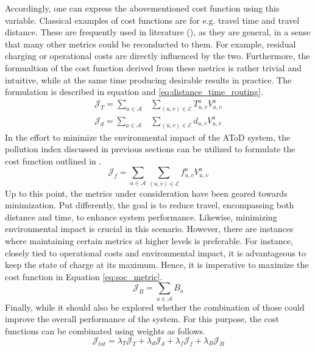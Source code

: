 Accordingly, one can express the abovementioned cost function using this variable. Classical examples of cost functions are for e.g. travel time and travel distance. These are frequently used in literature (\cite{7579135}), as they are general, in a sense that many other metrics could be reconducted to them. For example, residual charging or operational costs are directly influenced by the two. Furthermore, the formualtion of the cost function derived from these metrics is rather trivial and intuitive, while at the same time producing desirable results in practice. The formulation is described in equation  and \ref{eq:distance_time_routing}. \\
\begin{align}
	\mathcal{J}_T = \sum_{a \in \mathcal{A}} &\sum_{(u, v) \in \mathcal{E}} T^a_{ u,v} V^a_{u,v} \label{eq:travel_time_routing}\\
	\mathcal{J}_d = \sum_{a \in \mathcal{A}} &\sum_{(u, v) \in \mathcal{E}} d_{ u,v} V^a_{u,v}\label{eq:distance_time_routing}
\end{align} 
In the effort to minimize the environmental impact of the AToD system, the pollution index discussed in previous sections can be utilized to formulate the cost function outlined in .
\begin{equation}
	\mathcal{J}_f =\sum_{a \in \mathcal{A}} \sum_{(u, v) \in \mathcal{E}} f^a_{ u,v} V^a_{u,v} 
	\label{eq:pollution_metric}
\end{equation} 
Up to this point, the metrics under consideration have been geared towards minimization. Put differently, the goal is to reduce travel, encompassing both distance and time, to enhance system performance. Likewise, minimizing environmental impact is crucial in this scenario. However, there are instances where maintaining certain metrics at higher levels is preferable. For instance, closely tied to operational costs and environmental impact, it is advantageous to keep the state of charge at its maximum. Hence, it is imperative to maximize the cost function in Equation \ref{eq:soc_metric}.
\begin{equation}
	\mathcal{J}_B =\sum_{a \in \mathcal{A}}  B_a 
	\label{eq:soc_metric}
\end{equation} 
Finally, while it should also be explored whether the combination of those could improve the overall performance of the system. For this purpose, the cost functions can be combinated using weights as follows.  
\begin{equation}
	\mathcal{J}_{tot} = \lambda_T\mathcal{J}_T +\lambda_d\mathcal{J}_d +\lambda_f\mathcal{J}_f +\lambda_B\mathcal{J}_B 
	\label{eq:combined_metrics}
\end{equation} \\
